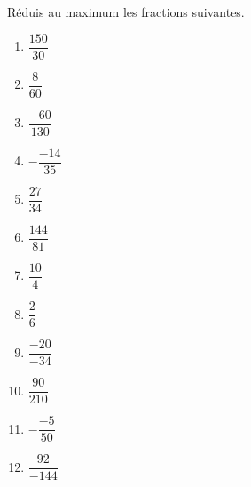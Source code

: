 %
%
  Réduis au maximum les fractions suivantes.
  \begin{enumerate}[cols=3]
    \item $\dfrac{150}{30}$
    \item $\dfrac{8}{60}$
    \item $\dfrac{-60}{130}$
    \item $-\dfrac{-14}{35}$
    \item $\dfrac{27}{34}$
    \item $\dfrac{144}{81}$
    \item $\dfrac{10}{4}$
    \item $\dfrac{2}{6}$
    \item $\dfrac{-20}{-34}$
    \item $\dfrac{90}{210}$
    \item $-\dfrac{-5}{50}$
    \item $\dfrac{92}{-144}$
  \end{enumerate}
